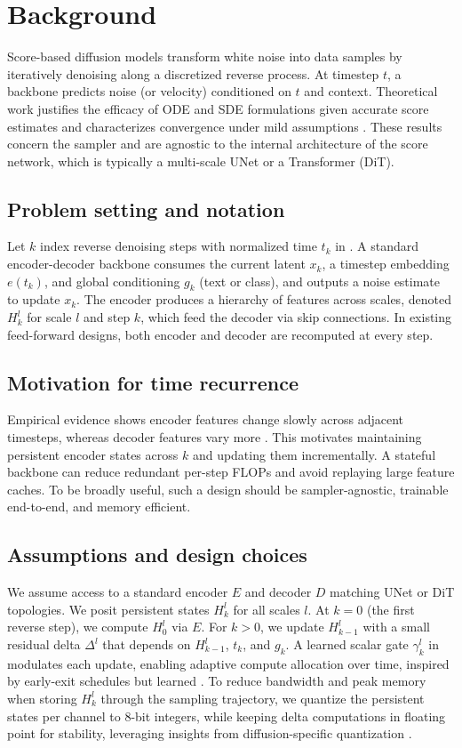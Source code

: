 \documentclass{article}
\begin{document}
\section{Background}
Score-based diffusion models transform white noise into data samples by iteratively denoising along a discretized reverse process. At timestep $t$, a backbone predicts noise (or velocity) conditioned on $t$ and context. Theoretical work justifies the efficacy of ODE and SDE formulations given accurate score estimates and characterizes convergence under mild assumptions \cite{chen-2022-sampling,chen-2023-the,cheng-2017-convergence,chen-2022-improved,benton-2023-nearlyd}. These results concern the sampler and are agnostic to the internal architecture of the score network, which is typically a multi-scale UNet or a Transformer (DiT).

\subsection{Problem setting and notation}
Let $k$ index reverse denoising steps with normalized time $t_k$ in . A standard encoder-decoder backbone consumes the current latent $x_k$, a timestep embedding $e(t_k)$, and global conditioning $g_k$ (text or class), and outputs a noise estimate to update $x_k$. The encoder produces a hierarchy of features across scales, denoted $H_k^l$ for scale $l$ and step $k$, which feed the decoder via skip connections. In existing feed-forward designs, both encoder and decoder are recomputed at every step.

\subsection{Motivation for time recurrence}
Empirical evidence shows encoder features change slowly across adjacent timesteps, whereas decoder features vary more \cite{li-2023-faster}. This motivates maintaining persistent encoder states across $k$ and updating them incrementally. A stateful backbone can reduce redundant per-step FLOPs and avoid replaying large feature caches. To be broadly useful, such a design should be sampler-agnostic, trainable end-to-end, and memory efficient.

\subsection{Assumptions and design choices}
We assume access to a standard encoder $E$ and decoder $D$ matching UNet or DiT topologies. We posit persistent states $H_k^l$ for all scales $l$. At $k=0$ (the first reverse step), we compute $H_0^l$ via $E$. For $k>0$, we update $H_{k-1}^l$ with a small residual delta $\Delta^l$ that depends on $H_{k-1}^l$, $t_k$, and $g_k$. A learned scalar gate $\gamma_k^l$ in  modulates each update, enabling adaptive compute allocation over time, inspired by early-exit schedules but learned \cite{moon-2024-simple}. To reduce bandwidth and peak memory when storing $H_k^l$ through the sampling trajectory, we quantize the persistent states per channel to 8-bit integers, while keeping delta computations in floating point for stability, leveraging insights from diffusion-specific quantization \cite{shang-2022-post}.
\end{document}
